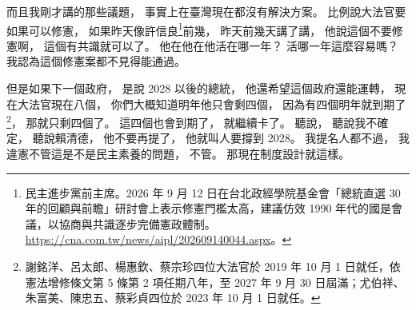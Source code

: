\hypertarget{w01:cue:1259}{}而且我剛才講的那些議題，
\hypertarget{w01:cue:1260}{}事實上在臺灣現在都沒有解決方案。
\hypertarget{w01:cue:1261}{}比例說大法官要如果可以修憲，
\hypertarget{w01:cue:1262}{}如果昨天像許信良\footnote{民主進步黨前主席。2026 年 9 月 12 日在台北政經學院基金會「總統直選 30 年的回顧與前瞻」研討會上表示修憲門檻太高，建議仿效 1990 年代的國是會議，以協商與共識逐步完備憲政體制。\url{https://cna.com.tw/news/aipl/202609140044.aspx}。}前幾，
\hypertarget{w01:cue:1263}{}昨天前幾天講了講，
\hypertarget{w01:cue:1264}{}他說這個不要修憲啊，
\hypertarget{w01:cue:1265}{}這個有共識就可以了。
\hypertarget{w01:cue:1266}{}他在他在他活在哪一年？
\hypertarget{w01:cue:1267}{}活哪一年這麼容易嗎？
\hypertarget{w01:cue:1268}{}我認為這個修憲案都不見得能通過。

\hypertarget{w01:cue:1269}{}但是如果下一個政府，
\hypertarget{w01:cue:1270}{}是說 2028 以後的總統，
\hypertarget{w01:cue:1271}{}他還希望這個政府還能運轉，
\hypertarget{w01:cue:1272}{}現在大法官現在八個，
\hypertarget{w01:cue:1273}{}你們大概知道明年他只會剩四個，
\hypertarget{w01:cue:1274}{}因為有四個明年就到期了\footnote{謝銘洋、呂太郎、楊惠欽、蔡宗珍四位大法官於 2019 年 10 月 1 日就任，依憲法增修條文第 5 條第 2 項任期八年，至 2027 年 9 月 30 日屆滿；尤伯祥、朱富美、陳忠五、蔡彩貞四位於 2023 年 10 月 1 日就任。}，
\hypertarget{w01:cue:1275}{}那就只剩四個了。
\hypertarget{w01:cue:1276}{}這四個也會到期了，
\hypertarget{w01:cue:1277}{}就繼續卡了。
\hypertarget{w01:cue:1278}{}聽說，
\hypertarget{w01:cue:1279}{}聽說我不確定，
\hypertarget{w01:cue:1280}{}聽說賴清德，
\hypertarget{w01:cue:1281}{}他不要再提了，
\hypertarget{w01:cue:1282}{}他就叫人要撐到 2028。
\hypertarget{w01:cue:1283}{}我提名人都不過，
\hypertarget{w01:cue:1284}{}我違憲不管這是不是民主素養的問題，
\hypertarget{w01:cue:1285}{}不管。
\hypertarget{w01:cue:1286}{}那現在制度設計就這樣。

